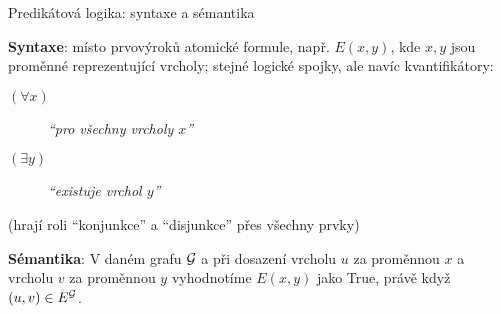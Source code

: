 \documentclass{beamer}
\begin{document}
\begin{frame}{Predikátová logika: syntaxe a sémantika}

    \textbf{Syntaxe}: místo prvovýroků \alert{atomické formule}, např. $E(x,y)$, kde $x,y$ jsou \alert{proměnné} reprezentující vrcholy; stejné logické spojky, ale navíc \alert{kvantifikátory}:
  
    \begin{description}
        \item[\alert{\( (\forall x) \)}] {\it``pro všechny vrcholy \(x\)''}
        \item[\alert{\( (\exists y) \)}] {\it``existuje vrchol \(y\)''}
    \end{description}
    (hrají roli ``konjunkce'' a ``disjunkce'' přes všechny prvky)
    

    \textbf{Sémantika}: V daném grafu \(\mathcal{G}\) a při \alert{dosazení} vrcholu \(u\) za proměnnou \(x\) a vrcholu \(v\) za proměnnou \(y\) \alert{vyhodnotíme} \( E(x,y) \) jako \alert{True}, právě když \alert{\( (u,v)\in E^{\mathcal{G}} \)}.
        
\end{frame}
\end{document}

